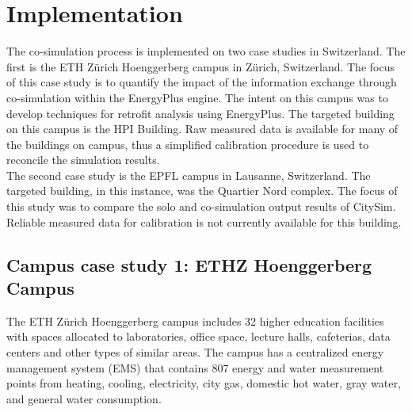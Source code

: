 \documentclass{tBPS2e}
\theoremstyle{plain}
\theoremstyle{definition}
\theoremstyle{remark}
\begin{document}

 
\section{Implementation}\label{Implementation and results}
The co-simulation process is implemented on two case studies in Switzerland.
The first is the ETH Z\"urich Hoenggerberg campus in Z\"urich, Switzerland.
The focus of this case study is to quantify the impact of the information
exchange through co-simulation within the EnergyPlus engine. The intent on
this campus was to develop techniques for retrofit analysis using EnergyPlus.
The targeted building on this campus is the HPI Building. Raw measured data is
available for many of the buildings on campus, thus a simplified calibration
procedure is used to reconcile the simulation results.\\

The second case study is the EPFL campus in Lausanne, Switzerland. The
targeted building, in this instance, was the Quartier Nord complex. The focus of
this study was to compare the solo and co-simulation output results of CitySim.
Reliable measured data for calibration is not currently available for this
building.

\subsection{Campus case study 1: ETHZ Hoenggerberg Campus}
The ETH Z\"urich Hoenggerberg campus includes 32 higher education facilities
with spaces allocated to laboratories, office space, lecture halls,
 cafeterias, data centers and other types of similar areas. The campus has a
 centralized energy management system (EMS) that contains 807 energy and water measurement points from heating, cooling, electricity, city gas, domestic hot water, gray water, and general water consumption. 
\end{document}
